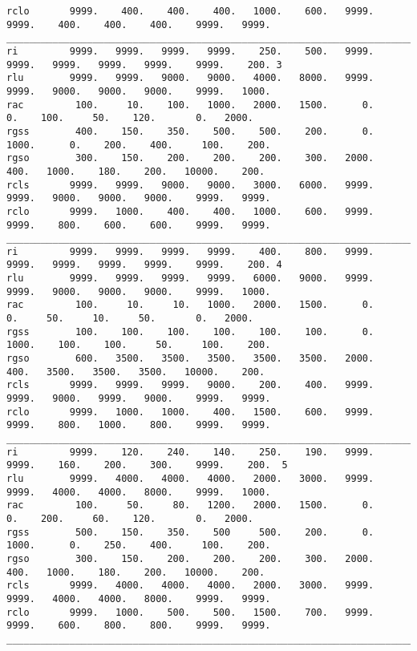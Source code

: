 \documentclass{egu}            %
\begin{document}
\begin{scriptsize}
\begin{verbatim}
rclo       9999.    400.    400.    400.   1000.    600.   9999.   9999.    400.    400.    400.    9999.   9999.
_________________________________________________________________________________________________________________
ri         9999.   9999.   9999.   9999.    250.    500.   9999.   9999.   9999.   9999.   9999.    9999.    200. 3
rlu        9999.   9999.   9000.   9000.   4000.   8000.   9999.   9999.   9000.   9000.   9000.    9999.   1000.
rac         100.     10.    100.   1000.   2000.   1500.      0.      0.    100.     50.    120.       0.   2000.
rgss        400.    150.    350.    500.    500.    200.      0.   1000.      0.    200.    400.     100.    200.
rgso        300.    150.    200.    200.    200.    300.   2000.    400.   1000.    180.    200.   10000.    200.
rcls       9999.   9999.   9000.   9000.   3000.   6000.   9999.   9999.   9000.   9000.   9000.    9999.   9999.
rclo       9999.   1000.    400.    400.   1000.    600.   9999.   9999.    800.    600.    600.    9999.   9999.
_________________________________________________________________________________________________________________
ri         9999.   9999.   9999.   9999.    400.    800.   9999.   9999.   9999.   9999.   9999.    9999.    200. 4
rlu        9999.   9999.   9999.   9999.   6000.   9000.   9999.   9999.   9000.   9000.   9000.    9999.   1000.
rac         100.     10.     10.   1000.   2000.   1500.      0.      0.     50.     10.     50.       0.   2000.
rgss        100.    100.    100.    100.    100.    100.      0.   1000.    100.    100.     50.     100.    200.
rgso        600.   3500.   3500.   3500.   3500.   3500.   2000.    400.   3500.   3500.   3500.   10000.    200. 
rcls       9999.   9999.   9999.   9000.    200.    400.   9999.   9999.   9000.   9999.   9000.    9999.   9999.
rclo       9999.   1000.   1000.    400.   1500.    600.   9999.   9999.    800.   1000.    800.    9999.   9999.
_________________________________________________________________________________________________________________
ri         9999.    120.    240.    140.    250.    190.   9999.   9999.    160.    200.    300.    9999.    200.  5
rlu        9999.   4000.   4000.   4000.   2000.   3000.   9999.   9999.   4000.   4000.   8000.    9999.   1000.
rac         100.     50.     80.   1200.   2000.   1500.      0.      0.    200.     60.    120.       0.   2000.
rgss        500.    150.    350.    500     500.    200.      0.   1000.      0.    250.    400.     100.    200.
rgso        300.    150.    200.    200.    200.    300.   2000.    400.   1000.    180.    200.   10000.    200.
rcls       9999.   4000.   4000.   4000.   2000.   3000.   9999.   9999.   4000.   4000.   8000.    9999.   9999.
rclo       9999.   1000.    500.    500.   1500.    700.   9999.   9999.    600.    800.    800.    9999.   9999.
_________________________________________________________________________________________________________________
\end{verbatim}\end{scriptsize}
\end{document}
